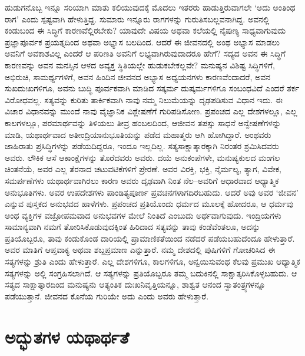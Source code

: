 ಹುಡುಗನೊಬ್ಬ ಇನ್ನೂ ಸರಿಯಾಗಿ ಮಾತು ಕಲಿಯುವುದಕ್ಕೆ ಮೊದಲು ಇತರರು ಹಾಡುತ್ತಿರು\-ವಾಗಲೇ ‘ಅದು ಅಂತಿಂಥ ರಾಗ’ ಎಂದು ಸ್ಪಷ್ಟವಾಗಿ ಹೇಳುತ್ತಿದ್ದ. ಸುಮಾರು ಇನ್ನೂರು ರಾಗಗಳನ್ನು ಗುರುತಿಸಬಲ್ಲವನಾಗಿದ್ದ. ಅವನಲ್ಲಿ ಕಂಡುಬಂದ ಈ ಸಿದ್ಧಿಗೆ ಕಾರಣವೆಲ್ಲಿರಬೇಕು? ಯಾವುದೇ ವಿಷಯ ಅಥವಾ ಕಲೆಯಲ್ಲಿ ನೈಪುಣ್ಯ ಸಾಧ್ಯವಾಗುವುದು ಪ್ರಜ್ಞಾಪೂರ್ವಕ ಪ್ರಯತ್ನದಿಂದ ಅಥವಾ ಅಭ್ಯಾಸ ಬಲದಿಂದ. ಆದರೆ ಈ ಜೀವನದಲ್ಲಿ ಅಂಥ ಅಭ್ಯಾಸ ಮಾಡಲು ಅವನಿಗೆ ಅವಕಾಶವಿಲ್ಲ ಎಂದರೆ ಆ ಪರಿಣತಿ ಅವನಿಗೆ ಲಭ್ಯವಾಗಿರುವುದಾದರೂ ಹೇಗೆ? ಸದ್ಯದ ಅವನ ಈ ಸಿದ್ಧಿಗೆ ಕಾರಣವನ್ನು ಅವನ ಮನಸ್ಸಿನ ಆಳದ ಅವ್ಯಕ್ತ ಸ್ಥಿತಿಯಲ್ಲೇ ಹುಡುಕಬೇಕಲ್ಲವೇ? ಮನುಷ್ಯನ ವಿಶಿಷ್ಟ ಸಿದ್ಧಿಗಳಿಗೆ, ಅಭಿರುಚಿ, ಸಾಮರ್ಥ್ಯಗಳಿಗೆ, ಅವನ ಹಿಂದಿನ ಜೀವನದ ಅಭ್ಯಾಸ ಅಧ್ಯಯನಗಳು ಕಾರಣವೆಂದಾದರೆ, ಅವನ ಸುಖದುಃಖಗಳಿಗೂ, ಅವನು ಬುದ್ಧಿ ಪೂರ್ವಕವಾಗಿ ಮಾಡಿದ ಸತ್ಕರ್ಮ ದುಷ್ಕರ್ಮಗಳಿಗೂ ಸಂಬಂಧವಿದೆ ಎಂದರೆ ತರ್ಕ ವಿರೋಧವಲ್ಲ. ಸತ್ಯವನ್ನು ಕುರಿತು ತಾರ್ಕಿಕವಾಗಿ ನಾವು ನಮ್ಮ ನಿಲುಮೆಯನ್ನು ದೃಢಪಡಿಸುವ ವಿಧಾನ ಇದು. ಈ ವಿಚಾರ ವಿಧಾನವನ್ನು ಮುಂದೆ ನಾವು ವೈಜ್ಞಾನಿಕ ವಿಶ್ಲೇಷಣೆಗೆ ಗುರಿಪಡಿಸೋಣ. ಪ್ರಪಂಚದ ಎಲ್ಲ ದೇಶಗಳಲ್ಲೂ, ಎಲ್ಲ ಕಾಲಗಳಲ್ಲೂ, ಪರಮಾರ್ಥವನ್ನು ತಿಳಿಯಲು ತೀವ್ರ ಹಂಬಲದಿಂದ, ಆಜೀವನ ತಪಸ್ಸು ಸಾಧನೆ ಅನ್ವೇಷಣೆಗಳನ್ನು ಮಾಡಿ, ಯಥಾರ್ಥವಾದ ಅತೀಂದ್ರಿಯಾನುಭೂತಿಯನ್ನು ಪಡೆದ ಮಹಾತ್ಮರು ಆಗಿ ಹೋಗಿದ್ದಾರೆ. ಅಂಥವರು ಜಾಹಿರಾತು ಪ್ರಸಿದ್ಧಿಗಳನ್ನು ಪಡೆಯದಿದ್ದರೂ, ಇಂದೂ ಇಲ್ಲದಿಲ್ಲ. ಸತ್ಯಸಾಕ್ಷಾತ್ಕಾರಕ್ಕಾಗಿ ನಿರಂತರ ಶ್ರಮಿಸಿದವರು ಅವರು. ಲೌಕಿಕ ಆಸೆ ಆಕಾಂಕ್ಷೆಗಳನ್ನು ತೊರೆದವರು ಅವರು. ದಯೆ ಅನುಕಂಪೆಗಳೇ, ಮನುಷ್ಯಕುಲದ ಮಂಗಲ ಚಿಂತನೆಯೆ, ಅವರ ಎಲ್ಲ ತೆರನಾದ ಚಟುವಟಿಕೆಗಳಿಗೆ ಪ್ರೇರಣೆ. ಅವರ ವಿರಕ್ತಿ, ಭಕ್ತಿ, ನೈರ್ಮಲ್ಯ, ತ್ಯಾಗ, ವಿವೇಕ, ಸಮರ್ಪಣೆಗಳು ಯಥಾರ್ಥವಾಗಿರಲು ಕಾರಣ ಅವರು ದೃಢವಾಗಿ ನಿಂತ ನೆಲ–ಅವರಿಗೆ ಆಧಾರವಾದ ಆಧ್ಯಾತ್ಮಿಕ ಅನುಭೂತಿಗಳು. ಅವರ ಉಪದೇಶಗಳು ಪಾಂಡಿತ್ಯಪೂರ್ಣ ಪ್ರವಚನಗಳಾಗದಿರಬಹುದು. ಆದರೆ ಅವು ಅವರ ‘ಜೀವನ’ ಎನ್ನುವ ಪುಸ್ತಕದ ಅನುಭವದ ಹಾಳೆಗಳು. ಪ್ರಪಂಚದ ಪ್ರತಿಯೊಂದು ಧರ್ಮದ ಮೂಲಕ್ಕೆ ಹೋದರೂ, ಆ ಧರ್ಮವು ಅಂಥ ವ್ಯಕ್ತಿಗಳ ವಜ್ರೋಪಮವಾದ ಅನುಭವಗಳ ಮೇಲೆ ನಿಂತಿದೆ ಎಂಬುದು ಅರ್ಥವಾಗುವುದು. ಇಂದ್ರಿಯಗಳು ಸಾಮಾನ್ಯವಾಗಿ ನಮಗೆ ತೋರಿಸಿಕೊಡುವುದಕ್ಕಿಂತ ಹಿರಿದಾದ ಸತ್ಯವನ್ನು ತಾವು ಕಂಡೆವೆಂತಲೂ, ಅದನ್ನು ಪ್ರತಿಯೊಬ್ಬರೂ, ತಾವು ಕಂಡುಕೊಂಡ ದಾರಿಯಲ್ಲಿ ಪ್ರಾಮಾಣಿಕತೆಯಿಂದ ನಡೆದರೆ ಪಡೆಯಬಹುದೆಂದೂ ಹೇಳುತ್ತಾರೆ. ಅವರ ಮಾತಿಗೆ ಆಪ್ತವಾಕ್ಯ ಅಥವಾ ಶಬ್ದಪ್ರಮಾಣ ಎನ್ನುತ್ತಾರೆ. ನಮ್ಮ ದೇಶದಲ್ಲಿ ಪುಷಿಗಳಿಗೆ ಗೋಚರಿಸಿದ ಈ ಸತ್ಯಗಳನ್ನು ಶ್ರುತಿ ಎಂದು ಹೇಳುತ್ತಾರೆ. ಎಲ್ಲ ದೇಶಗಳಿಗೂ, ಕಾಲಗಳಿಗೂ, ಅನ್ವಯಿಸುವಂಥ ಕೆಲವು ಪ್ರಮುಖ ಆಧ್ಯಾತ್ಮಿಕ ಸತ್ಯಗಳನ್ನು ಅಲ್ಲಿ ಸಂಗ್ರಹಿಸಲಾಗಿದೆ. ಆ ಸತ್ಯಗಳನ್ನು ಪ್ರತಿಯೊಬ್ಬರೂ ತಮ್ಮ ಬದುಕಿನಲ್ಲಿ ಸಾಕ್ಷಾತ್ಕರಿಸಿಕೊಳ್ಳಬಹುದು. ಆ ಸತ್ಯದ ಸಾಕ್ಷಾತ್ಕಾರದಿಂದ ಮನುಷ್ಯನು ಆತ್ಯಂತಿಕ ದುಃಖನಿವೃತ್ತಿಯನ್ನೂ, ಶಾಶ್ವತ ಆನಂದ ಸ್ವಾತಂತ್ರ್ಯಗಳನ್ನೂ ಪಡೆಯುತ್ತಾನೆ. ಜೀವನದ ಕೊನೆಯ ಗುರಿಯೇ ಅದು ಎಂದು ಅವರು ಹೇಳುತ್ತಾರೆ.

\medskip


\section*{ಅದ್ಭುತಗಳ ಯಥಾರ್ಥತೆ}


